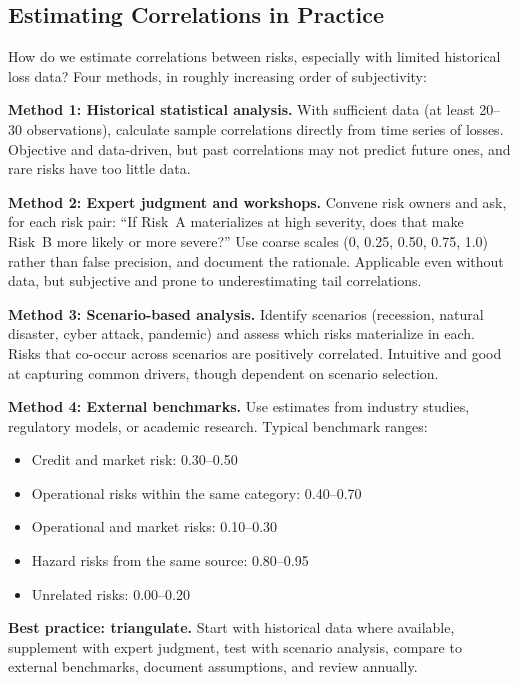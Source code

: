 \documentclass[11pt,openany]{book}
\providecommand{\tightlist}{\setlength{\itemsep}{0pt}\setlength{\parskip}{0pt}}
\begin{document}
\subsection{Estimating Correlations in Practice}
\label{subsec:estimating-correlations}

How do we estimate correlations between risks, especially with limited
historical loss data? Four methods, in roughly increasing order of
subjectivity:

\textbf{Method 1: Historical statistical analysis.} With sufficient data (at
least 20--30 observations), calculate sample correlations directly from time
series of losses. Objective and data-driven, but past correlations may not
predict future ones, and rare risks have too little data.

\textbf{Method 2: Expert judgment and workshops.} Convene risk owners and ask,
for each risk pair: ``If Risk~A materializes at high severity, does that make
Risk~B more likely or more severe?'' Use coarse scales (0, 0.25, 0.50, 0.75,
1.0) rather than false precision, and document the rationale. Applicable even
without data, but subjective and prone to underestimating tail correlations.

\textbf{Method 3: Scenario-based analysis.} Identify scenarios (recession,
natural disaster, cyber attack, pandemic) and assess which risks materialize
in each. Risks that co-occur across scenarios are positively correlated.
Intuitive and good at capturing common drivers, though dependent on scenario
selection.

\textbf{Method 4: External benchmarks.} Use estimates from industry studies,
regulatory models, or academic research. Typical benchmark ranges:
\begin{itemize}\tightlist
  \item Credit and market risk: 0.30--0.50
  \item Operational risks within the same category: 0.40--0.70
  \item Operational and market risks: 0.10--0.30
  \item Hazard risks from the same source: 0.80--0.95
  \item Unrelated risks: 0.00--0.20
\end{itemize}

\textbf{Best practice: triangulate.} Start with historical data where
available, supplement with expert judgment, test with scenario analysis,
compare to external benchmarks, document assumptions, and review annually.
\end{document}
